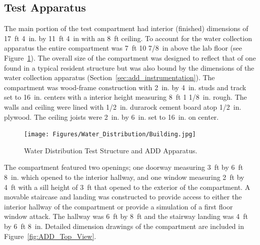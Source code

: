 \documentclass[12pt,oneside]{book}
\begin{document}
\subsection{Test Apparatus}
\label{ADD_discussion}
The main portion of the test compartment had interior (finished) dimensions of 17~ft 4~in. by 11~ft 4~in with an 8~ft ceiling. To account for the water collection apparatus the entire compartment was 7~ft 10 7/8~in above the lab floor (see Figure~\ref{fig:Water_Distribution_Test_Structure_and_ADD_Apparatus}). The overall size of the compartment was designed to reflect that of one found in a typical resident structure but was also bound by the dimensions of the water collection apparatus (Section~\ref{sec:add_instrumentation}). The compartment was wood-frame construction with 2~in. by 4~in. studs and track set to 16~in. centers with a interior height measuring 8~ft 1 1/8~in. rough. The walls and ceiling were lined with 1/2~in. durarock cement board atop 1/2~in. plywood. The ceiling joists were 2~in. by 6~in. set to 16~in. on center.

\begin{figure}[!ht]
	\centering
	\texttt{[image: Figures/Water\_Distribution/Building.jpg]}
	\caption[Water Distribution Test Structure and ADD Apparatus]{Water Distribution Test Structure and ADD Apparatus.}
	\label{fig:Water_Distribution_Test_Structure_and_ADD_Apparatus}
\end{figure}

The compartment featured two openings; one doorway measuring 3~ft by 6~ft 8~in. which opened to the interior hallway, and one window measuring 2~ft by 4~ft with a sill height of 3~ft that opened to the exterior of the compartment. A movable staircase and landing was constructed to provide access to either the interior hallway of the compartment or provide a simulation of a first floor window attack. The hallway was 6~ft by 8~ft and the stairway landing was 4~ft by 6~ft 8~in. Detailed dimension drawings of the compartment are included in Figure~\ref{fig:ADD_Top_View}.
\end{document}
